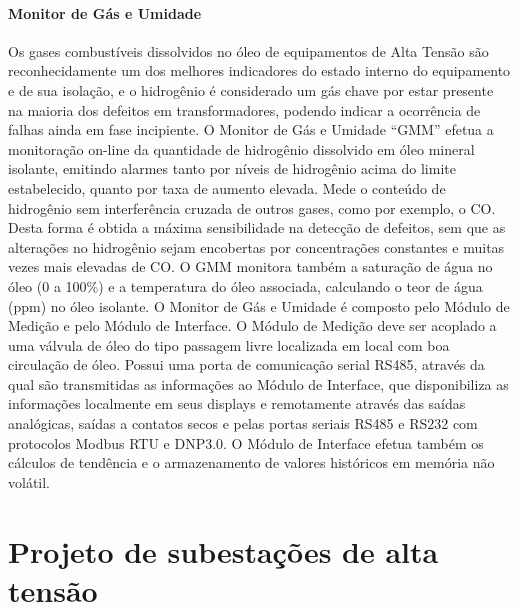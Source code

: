 \documentclass[a5paper]{ufsc-thesis}
\begin{document}
\subsubsection{Monitor de Gás e Umidade}
Os gases combustíveis dissolvidos no óleo de equipamentos de Alta Tensão são reconhecidamente um dos melhores indicadores do estado interno do equipamento e de sua isolação, e o hidrogênio é considerado um gás chave por estar presente na maioria dos defeitos em transformadores, podendo indicar a ocorrência de falhas ainda em fase incipiente. O Monitor de Gás e Umidade “GMM” efetua a monitoração on-line da quantidade de hidrogênio dissolvido em óleo mineral isolante, emitindo alarmes tanto por níveis de hidrogênio acima do limite estabelecido, quanto por taxa de aumento elevada. Mede o conteúdo de hidrogênio sem interferência cruzada de outros gases, como por exemplo, o CO. Desta forma é obtida a máxima sensibilidade na detecção de defeitos, sem que as alterações no hidrogênio sejam encobertas por concentrações constantes e muitas vezes mais elevadas de CO. O GMM monitora também a saturação de água no óleo (0 a 100\%) e a temperatura do óleo associada, calculando o teor de água (ppm) no óleo isolante. O Monitor de Gás e Umidade é composto pelo Módulo de Medição e pelo Módulo de Interface. O Módulo de Medição deve ser acoplado a uma válvula de óleo do tipo passagem livre localizada em local com boa circulação de óleo. Possui uma porta de comunicação serial RS485, através da qual são transmitidas as informações ao Módulo de Interface, que disponibiliza as informações localmente em seus displays e remotamente através das saídas analógicas, saídas a contatos secos e pelas portas seriais RS485 e RS232 com protocolos Modbus RTU e DNP3.0. O Módulo de Interface efetua também os cálculos de tendência e o armazenamento de valores históricos em memória não volátil.






\chapter{Projeto de subestações de alta tensão}
\label{chap:projSEAT}
\lipsum

\end{document}

